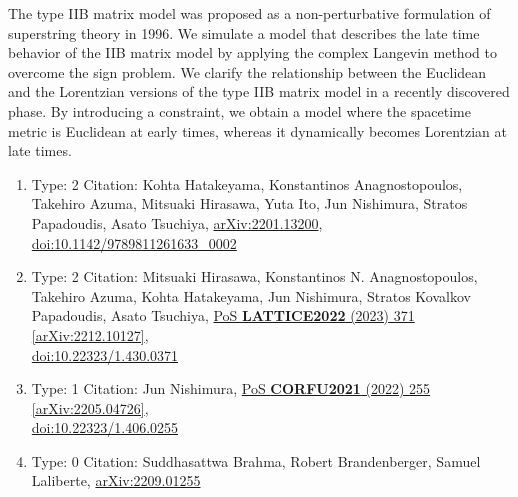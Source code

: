 \documentclass[a4paper,10pt]{article}
\begin{document}
\begin{enumerate}
The type IIB matrix model was proposed as a non-perturbative formulation of superstring theory in 1996. We simulate a model that describes the late time behavior of the IIB matrix model by applying the complex Langevin method to overcome the sign problem. We clarify the relationship between the Euclidean and the Lorentzian versions of the type IIB matrix model in a recently discovered phase. By introducing a constraint, we obtain a model where the spacetime metric is Euclidean at early times, whereas it dynamically becomes Lorentzian at late times.
\begin{enumerate}
  \item Type: 2 Citation: Kohta Hatakeyama, Konstantinos Anagnostopoulos, Takehiro Azuma, Mitsuaki Hirasawa, Yuta Ito, Jun Nishimura, Stratos Papadoudis, Asato Tsuchiya, \href{https://arxiv.org/abs/2201.13200}{arXiv:2201.13200},\\\href{https://www.doi.org/10.1142/9789811261633_0002}{doi:10.1142/9789811261633\_0002}
  \item Type: 2 Citation: Mitsuaki Hirasawa, Konstantinos N. Anagnostopoulos, Takehiro Azuma, Kohta Hatakeyama, Jun Nishimura, Stratos Kovalkov Papadoudis, Asato Tsuchiya, \href{https://www.doi.org/10.22323/1.430.0371}{PoS {\bf LATTICE2022} (2023) 371}  \href{https://arxiv.org/abs/2212.10127}{[arXiv:2212.10127]},\\\href{https://www.doi.org/10.22323/1.430.0371}{doi:10.22323/1.430.0371}
  \item Type: 1 Citation: Jun Nishimura, \href{https://www.doi.org/10.22323/1.406.0255}{PoS {\bf CORFU2021} (2022) 255}  \href{https://arxiv.org/abs/2205.04726}{[arXiv:2205.04726]},\\\href{https://www.doi.org/10.22323/1.406.0255}{doi:10.22323/1.406.0255}
  \item Type: 0 Citation: Suddhasattwa Brahma, Robert Brandenberger, Samuel Laliberte, \href{https://arxiv.org/abs/2209.01255}{arXiv:2209.01255}

\end{enumerate}
\end{enumerate}
\end{document}
